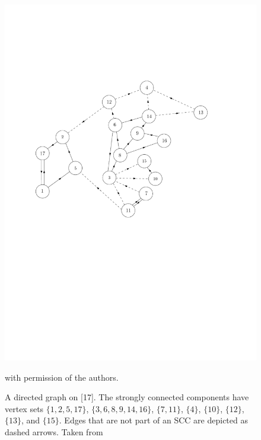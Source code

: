 \begin{figure}
    \centering
    \includegraphics[scale=0.6]{Content/Pictures/biggraph.pdf}
    \caption{A directed graph on [17]. The strongly connected components have vertex sets $\{1,2,5,17\}$, $\{3,6,8,9,14,16\}$, $\{7,11\}$, $\{4\}$, $\{10\}$, $\{12\}$, $\{13\}$, and $\{15\}$. Edges that are not part of an SCC are depicted as dashed arrows. Taken from \cite{goldschmidtScalingLimitCritical2019}} with permission of the authors.
    \label{fig.SCCs}
\end{figure}


